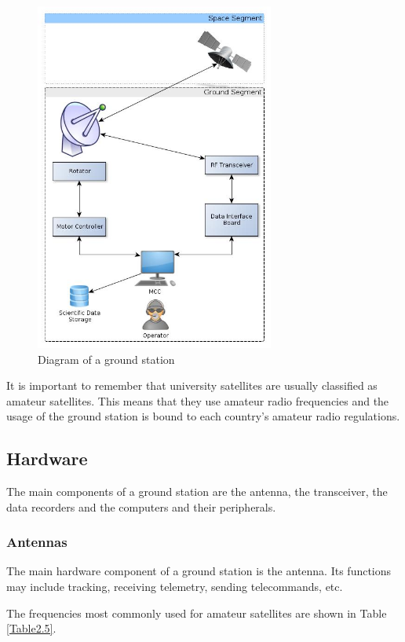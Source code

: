 \begin{figure}[H]
\centerline{\includegraphics[width=0.7\textwidth]{images/gsdiagram.jpg}}
\caption{Diagram of a ground station}
\label{f2.8}
\end{figure}


It is important to remember that university satellites are usually classified as amateur satellites. This means that they use amateur radio frequencies and the usage of the ground station is bound to each country's amateur radio regulations.

\subsection{Hardware}

The main components of a ground station are the antenna, the transceiver, the data recorders and the computers and their peripherals.

\subsubsection{Antennas}
The main hardware component of a ground station is the antenna. Its functions may include tracking, receiving telemetry, sending telecommands, etc.

The frequencies most commonly used for amateur satellites are shown in Table \ref{Table2.5}.

